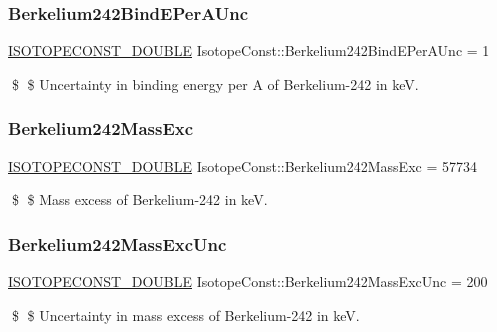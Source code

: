 \subsubsection{\texorpdfstring{Berkelium242\+Bind\+E\+Per\+A\+Unc}{Berkelium242BindEPerAUnc}}
{\footnotesize\ttfamily \mbox{\hyperlink{group___isotope_const-_macros_ga8f45a7272ce02c0b4c65c44636ed719a}{I\+S\+O\+T\+O\+P\+E\+C\+O\+N\+S\+T\+\_\+\+D\+O\+U\+B\+LE}} Isotope\+Const\+::\+Berkelium242\+Bind\+E\+Per\+A\+Unc = 1}

\$ \$ Uncertainty in binding energy per A of Berkelium-\/242 in keV. \mbox{\label{group___isotope_const-_berkelium-_bk242_ga836da5a21ada03be93829115e0d94b65}} 
\subsubsection{\texorpdfstring{Berkelium242\+Mass\+Exc}{Berkelium242MassExc}}
{\footnotesize\ttfamily \mbox{\hyperlink{group___isotope_const-_macros_ga8f45a7272ce02c0b4c65c44636ed719a}{I\+S\+O\+T\+O\+P\+E\+C\+O\+N\+S\+T\+\_\+\+D\+O\+U\+B\+LE}} Isotope\+Const\+::\+Berkelium242\+Mass\+Exc = 57734}

\$ \$ Mass excess of Berkelium-\/242 in keV. \mbox{\label{group___isotope_const-_berkelium-_bk242_ga24582711699b241c849afee5874393f7}} 
\subsubsection{\texorpdfstring{Berkelium242\+Mass\+Exc\+Unc}{Berkelium242MassExcUnc}}
{\footnotesize\ttfamily \mbox{\hyperlink{group___isotope_const-_macros_ga8f45a7272ce02c0b4c65c44636ed719a}{I\+S\+O\+T\+O\+P\+E\+C\+O\+N\+S\+T\+\_\+\+D\+O\+U\+B\+LE}} Isotope\+Const\+::\+Berkelium242\+Mass\+Exc\+Unc = 200}

\$ \$ Uncertainty in mass excess of Berkelium-\/242 in keV. \mbox{\label{group___isotope_const-_berkelium-_bk242_ga50944069043a00ef66210ee53b2671de}} 
